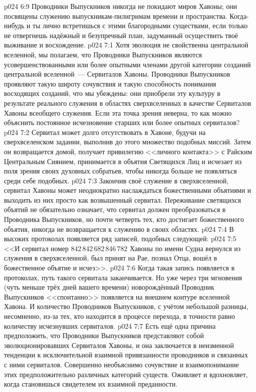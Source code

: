 \vs p024 6:9 \pc Проводники Выпускников никогда не покидают миров Хавоны; они посвящены служению выпускникам\hyp{}пилигримам времени и пространства. Когда\hyp{}нибудь и ты лично встретишься с этими благородными существами, если только не отвергнешь надёжный и безупречный план, задуманный осуществить твоё выживание и восхождение.
\vs p024 7:1 Хотя эволюция не свойственна центральной вселенной, мы полагаем, что Проводники Выпускников являются усовершенствованными или более опытными членами другой категории созданий центральной вселенной~--- Сервиталов Хавоны. Проводники Выпускников проявляют такую широту сочувствия и такую способность понимания восходящих созданий, что мы убеждены: они приобрели эту культуру в результате реального служения в областях сверхвселенных в качестве Сервиталов Хавоны всеобщего служения. Если эта точка зрения неверна, то как можно объяснить постоянное исчезновение старших или более опытных сервиталов?
\vs p024 7:2 Сервитал может долго отсутствовать в Хавоне, будучи на сверхвселенском задании, выполнив до этого множество подобных миссий. Затем он возвращается домой, получает привилегию <<личного контакта>> с Райским Центральным Сиянием, принимается в объятия Светящихся Лиц и исчезает из поля зрения своих духовных собратьев, чтобы никогда больше не появляться среди себе подобных.
\vs p024 7:3 Закончив своё служение в сверхвселенной, сервитал Хавоны может неоднократно наслаждаться божественными объятиями и выходить из них просто как возвышенный сервитал. Переживание светящихся объятий не обязательно означает, что сервитал должен преобразоваться в Проводника Выпускников, но почти четверть тех, кто достигает божественного объятия, никогда не возвращается к служению в своих областях.
\vs p024 7:4 \pc В высоких протоколах появляется ряд записей, подобных следующей:
\vs p024 7:5 <<И сервитал номер 842\,842\,682\,846\,782 Хавоны по имени Судна вернулся из служения в сверхвселенной, был принят на Рае, познал Отца, вошёл в божественное объятие и исчез>>.
\vs p024 7:6 Когда такая запись появляется в протоколах, путь такого сервитала заканчивается. Но уже через три мгновения (чуть меньше трёх дней вашего времени) новорождённый Проводник Выпускников <<спонтанно>> появляется на внешнем контуре вселенной Хавона. И количество Проводников Выпускников, с учётом небольшой разницы, несомненно, из-за тех, кто находится в процессе перехода, в точности равно количеству исчезнувших сервиталов.
\vs p024 7:7 \pc Есть ещё одна причина предположить, что Проводники Выпускников представляют собой эволюционировавших Сервиталов Хавоны, и она заключается в неизменной тенденции к исключительной взаимной привязанности проводников и связанных с ними сервиталов. Совершенно необъяснимо сочувствие и взаимопонимание этих предположительно различных категорий существ. Оживляет и вдохновляет, когда становишься свидетелем их взаимной преданности.

